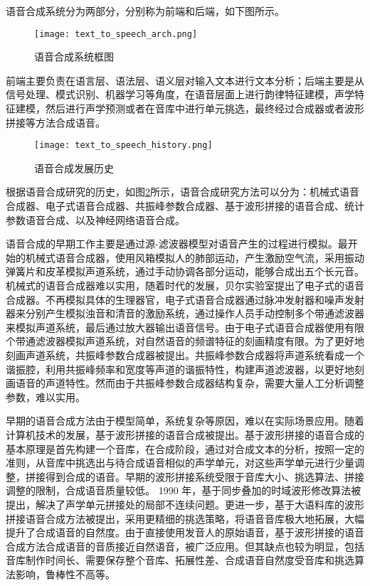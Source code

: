 \documentclass[cn,10pt,math=newtx,citestyle=gb7714-2015,bibstyle=gb7714-2015]{elegantbook}
\begin{document}
  语音合成系统分为两部分，分别称为前端和后端，如下图所示。

  \begin{figure}[htbp]
    \centering
    \texttt{[image: text\_to\_speech\_arch.png]}
    \caption{语音合成系统框图 \label{fig:text_to_speech_arch}}
  \end{figure}

  前端主要负责在语言层、语法层、语义层对输入文本进行文本分析；后端主要是从信号处理、模式识别、机器学习等角度，在语音层面上进行韵律特征建模，声学特征建模，然后进行声学预测或者在音库中进行单元挑选，最终经过合成器或者波形拼接等方法合成语音。

  \begin{figure}[htbp]
    \centering
    \texttt{[image: text\_to\_speech\_history.png]}
    \caption{语音合成发展历史 \label{fig:text_to_speech_history}}
  \end{figure}

  根据语音合成研究的历史，如图\ref{fig:text_to_speech_history}所示，语音合成研究方法可以分为：机械式语音合成器、电子式语音合成器、共振峰参数合成器、基于波形拼接的语音合成、统计参数语音合成、以及神经网络语音合成。

  语音合成的早期工作主要是通过源-滤波器模型对语音产生的过程进行模拟。最开始的机械式语音合成器，使用风箱模拟人的肺部运动，产生激励空气流，采用振动弹簧片和皮革模拟声道系统，通过手动协调各部分运动，能够合成出五个长元音。机械式的语音合成器难以实用，随着时代的发展，贝尔实验室提出了电子式的语音合成器。不再模拟具体的生理器官，电子式语音合成器通过脉冲发射器和噪声发射器来分别产生模拟浊音和清音的激励系统，通过操作人员手动控制多个带通滤波器来模拟声道系统，最后通过放大器输出语音信号。由于电子式语音合成器使用有限个带通滤波器模拟声道系统，对自然语音的频谱特征的刻画精度有限。为了更好地刻画声道系统，共振峰参数合成器被提出。共振峰参数合成器将声道系统看成一个谐振腔，利用共振峰频率和宽度等声道的谐振特性，构建声道滤波器，以更好地刻画语音的声道特性。然而由于共振峰参数合成器结构复杂，需要大量人工分析调整参数，难以实用。

  早期的语音合成方法由于模型简单，系统复杂等原因，难以在实际场景应用。随着计算机技术的发展，基于波形拼接的语音合成被提出。基于波形拼接的语音合成的基本原理是首先构建一个音库，在合成阶段，通过对合成文本的分析，按照一定的准则，从音库中挑选出与待合成语音相似的声学单元，对这些声学单元进行少量调整，拼接得到合成的语音。早期的波形拼接系统受限于音库大小、挑选算法、拼接调整的限制，合成语音质量较低。 1990 年，基于同步叠加的时域波形修改算法被提出，解决了声学单元拼接处的局部不连续问题。更进一步，基于大语料库的波形拼接语音合成方法被提出，采用更精细的挑选策略，将语音音库极大地拓展，大幅提升了合成语音的自然度。由于直接使用发音人的原始语音，基于波形拼接的语音合成方法合成语音的音质接近自然语音，被广泛应用。但其缺点也较为明显，包括音库制作时间长、需要保存整个音库、拓展性差、合成语音自然度受音库和挑选算法影响，鲁棒性不高等。
\end{document}
